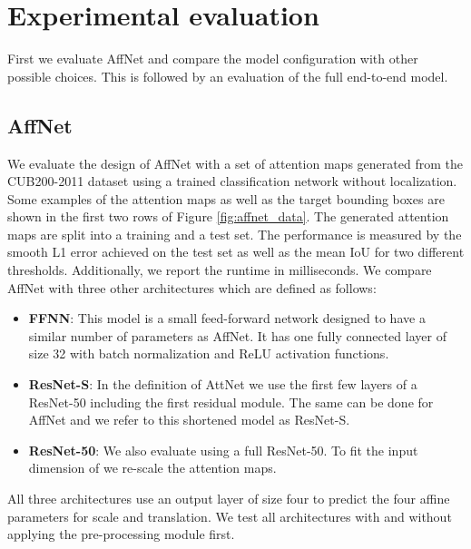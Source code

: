 \documentclass{bmvc2k}
\begin{document}
\section{Experimental evaluation}
First we evaluate AffNet and compare the model configuration with other possible choices. This is followed by an evaluation of the full end-to-end model.

\subsection{AffNet}
We evaluate the design of AffNet with a set of attention maps generated from the CUB200-2011 dataset using a trained classification network without localization. Some examples of the attention maps as well as the target bounding boxes are shown in the first two rows of Figure \ref{fig:affnet_data}. The generated attention maps are split into a training and a test set.
The performance is measured by the smooth L1 error achieved on the test set as well as the mean IoU for two different thresholds. Additionally, we report the runtime in milliseconds.
We compare AffNet with three other architectures which are defined as follows:
\begin{itemize}
 \item \textbf{FFNN}: This model is a small feed-forward network designed to have a similar number of parameters as AffNet. It has one fully connected layer of size 32 with batch normalization and ReLU activation functions.
 \item \textbf{ResNet-S}: In the definition of AttNet we use the first few layers of a ResNet-50 including the first residual module. The same can be done for AffNet and we refer to this shortened model as ResNet-S.
 \item \textbf{ResNet-50}: We also evaluate using a full ResNet-50. To fit the input dimension of  we re-scale the attention maps.
\end{itemize}

All three architectures use an output layer of size four to predict the four affine parameters for scale and translation. We test all architectures with and without applying the pre-processing module first.
\end{document}
